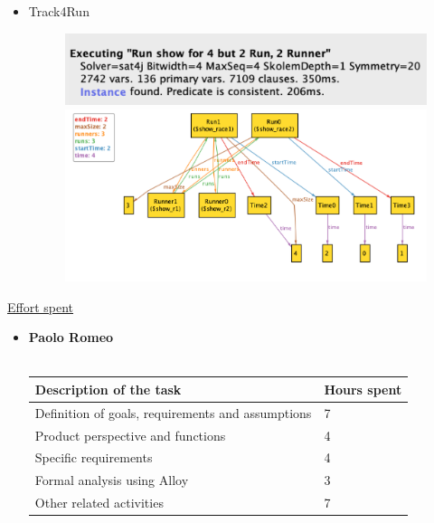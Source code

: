 \documentclass{article}
\begin{document}
\begin{legal}
\begin{itemize}
\begin{figure}[H]
			\end{figure}
			\newpage
			\item Track4Run
			\begin{figure}[H]
		  				\includegraphics[width=\linewidth]{./images/alloy/track4Run-Run.png}
		  				\includegraphics[width=\linewidth]{./images/alloy/track4Run-World.png}
			\end{figure}
		\end{itemize}
	\newpage
	\item \underline{Effort spent}\\
		{\normalfont
		\begin{itemize}
		\item \textbf{Paolo Romeo}\\\\
				\begin{tabular}{| m{9cm} | m{3cm}| }
				\hline
					\textbf{Description of the task} & \textbf{Hours spent}\\
				\hline
					Definition of goals, requirements and assumptions & 7 \\
				\hline
					Product perspective and functions & 4 \\
				\hline
					Specific requirements & 4 \\
				\hline
					Formal analysis using Alloy & 3 \\
				\hline
					Other related activities & 7 \\
				\hline
				\end{tabular}
				\\\\\\

\end{itemize}}
\end{legal}
\end{document}
